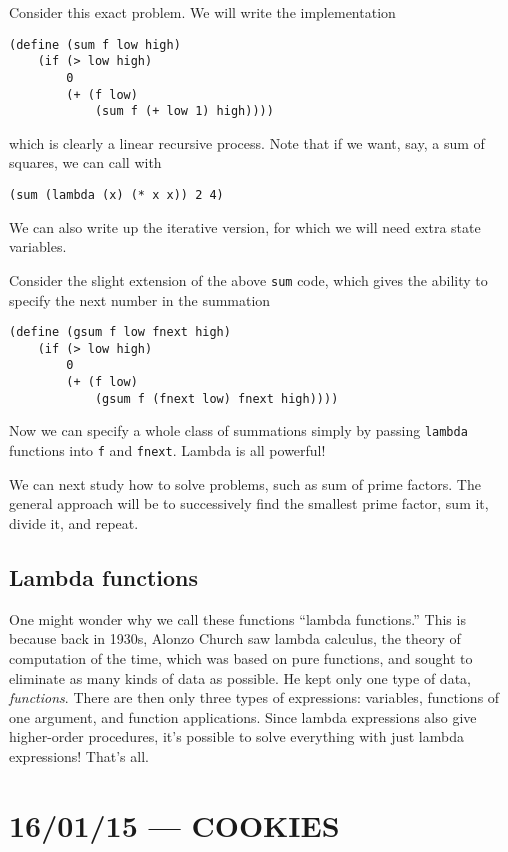 \documentclass[10pt]{report}
\begin{document}
Consider this exact problem. We will write the implementation
\begin{verbatim}
(define (sum f low high)
    (if (> low high)
        0
        (+ (f low)
            (sum f (+ low 1) high))))
\end{verbatim}
which is clearly a linear recursive process. Note that if we want, say, a sum of squares, we can call with 
\begin{center}
    \texttt{(sum (lambda (x) (* x x)) 2 4)}
\end{center}

We can also write up the iterative version, for which we will need extra state variables.

Consider the slight extension of the above \texttt{sum} code, which gives the ability to specify the next number in the summation
\begin{verbatim}
(define (gsum f low fnext high)
    (if (> low high)
        0
        (+ (f low)
            (gsum f (fnext low) fnext high))))
\end{verbatim}

Now we can specify a whole class of summations simply by passing \texttt{lambda} functions into \texttt{f} and \texttt{fnext}. Lambda is all powerful!

We can next study how to solve problems, such as sum of prime factors. The general approach will be to successively find the smallest prime factor, sum it, divide it, and repeat.

\section{Lambda functions}

One might wonder why we call these functions ``lambda functions.'' This is because back in 1930s, Alonzo Church saw lambda calculus, the theory of computation of the time, which was based on pure functions, and sought to eliminate as many kinds of data as possible. He kept only one type of data, \emph{functions}. There are then only three types of expressions: variables, functions of one argument, and function applications. Since lambda expressions also give higher-order procedures, it's possible to solve everything with just lambda expressions! That's all.

\chapter{16/01/15 --- COOKIES}
\end{document}
